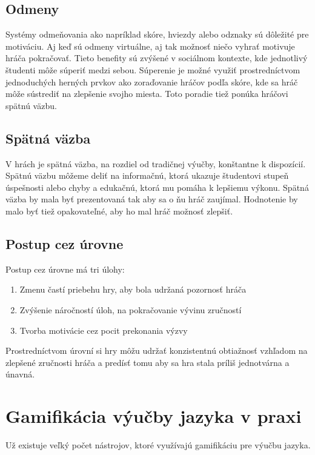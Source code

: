 \documentclass[10pt,twoside,slovak,a4paper]{article}
\begin{document}
\subsection{Odmeny}

Systémy odmeňovania ako napríklad skóre, hviezdy alebo odznaky sú dôležité pre motiváciu. Aj keď sú odmeny virtuálne, aj tak možnosť niečo vyhrať motivuje hráča pokračovať. Tieto benefity sú zvýšené v sociálnom kontexte, kde jednotlivý študenti môže súperiť medzi sebou. Súperenie je možné využiť prostredníctvom jednoduchých herných prvkov ako zoraďovanie hráčov podľa skóre, kde sa hráč môže sústrediť na zlepšenie svojho miesta. Toto poradie tiež ponúka hráčovi spätnú väzbu. \cite{Kapp}

\subsection{Spätná väzba}

V hrách je spätná väzba, na rozdiel od tradičnej výučby, konštantne k dispozícií. Spätnú väzbu môžeme deliť na informačnú, ktorá ukazuje študentovi stupeň úspešnosti alebo chyby a edukačnú, ktorá mu pomáha k lepšiemu výkonu. Spätná väzba by mala byť prezentovaná tak aby sa o ňu hráč zaujímal. Hodnotenie by malo byť tiež opakovateľné, aby ho mal hráč možnosť zlepšiť.  \cite{Kapp}

\subsection{Postup cez úrovne}

Postup cez úrovne má tri úlohy:
\begin{enumerate}
	\item Zmenu častí priebehu hry, aby bola udržaná pozornosť hráča
	\item Zvýšenie náročností úloh, na pokračovanie vývinu zručností
	\item Tvorba motivácie cez pocit prekonania výzvy
\end{enumerate}
Prostredníctvom úrovní si hry môžu udržať konzistentnú obtiažnosť vzhľadom na zlepšené zručnosti hráča a predísť tomu aby sa hra stala príliš jednotvárna a únavná. \cite{Kapp}

\section{Gamifikácia výučby jazyka v praxi} \label{prax}

Už existuje veľký počet nástrojov, ktoré využívajú gamifikáciu pre výučbu jazyka.
\end{document}

